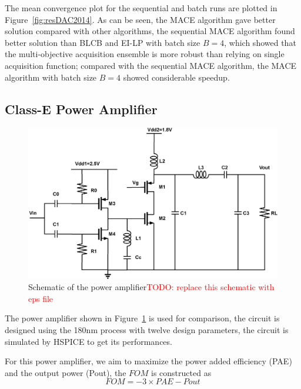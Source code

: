 The mean convergence plot for the sequential and batch runs are plotted in
Figure~\ref{fig:resDAC2014}. As can be seen, the MACE algorithm gave better
solution compared with other algorithms, the sequential MACE algorithm found
better solution than BLCB and EI-LP with batch size $B = 4$, which showed that
the multi-objective acquisition ensemble is more robust than relying on single
acquisition function; compared with the sequential MACE algorithm, the MACE
algorithm with batch size $B = 4$ showed considerable speedup.


\subsection{Class-E Power Amplifier}


\begin{figure}[htbp]
    \begin{center}
        \centerline{\includegraphics[width=\columnwidth]{./img/classE.eps}}
        \caption{Schematic of the power amplifier\textcolor{red}{TODO: replace this schematic with eps file} }
        \label{fig:schPA}
    \end{center}
\end{figure}

The power amplifier shown in Figure~\ref{fig:schPA} is used for comparison, the
circuit is designed using the 180nm process with twelve design parameters, the
circuit is simulated by HSPICE to get its performances.

For this power amplifier, we aim to maximize the power added efficiency (PAE) and the output power (Pout), the $FOM$ is constructed as
$$
\mathit{FOM} = -3 \times \mathit{PAE} - \mathit{Pout}
$$


